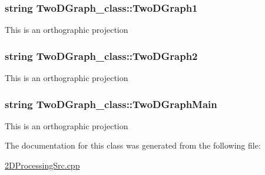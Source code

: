 \subsubsection[{\texorpdfstring{Two\+D\+Graph1}{TwoDGraph1}}]{\setlength{\rightskip}{0pt plus 5cm}string Two\+D\+Graph\+\_\+class\+::\+Two\+D\+Graph1\hspace{0.3cm}{\ttfamily [static]}}\hypertarget{classTwoDGraph__class_a5ca4ece6cefc90e4b73be743f9292d06}{}\label{classTwoDGraph__class_a5ca4ece6cefc90e4b73be743f9292d06}
This is an orthographic projection 
\subsubsection[{\texorpdfstring{Two\+D\+Graph2}{TwoDGraph2}}]{\setlength{\rightskip}{0pt plus 5cm}string Two\+D\+Graph\+\_\+class\+::\+Two\+D\+Graph2\hspace{0.3cm}{\ttfamily [static]}}\hypertarget{classTwoDGraph__class_ade9259accbf5d06b05e65429dfde4ed5}{}\label{classTwoDGraph__class_ade9259accbf5d06b05e65429dfde4ed5}
This is an orthographic projection 
\subsubsection[{\texorpdfstring{Two\+D\+Graph\+Main}{TwoDGraphMain}}]{\setlength{\rightskip}{0pt plus 5cm}string Two\+D\+Graph\+\_\+class\+::\+Two\+D\+Graph\+Main\hspace{0.3cm}{\ttfamily [static]}}\hypertarget{classTwoDGraph__class_aec0627f5c9c38a4b1bfe6aeec7e0237b}{}\label{classTwoDGraph__class_aec0627f5c9c38a4b1bfe6aeec7e0237b}
This is an orthographic projection 

The documentation for this class was generated from the following file\+:\begin{DoxyCompactItemize}
\item 
\hyperlink{2DProcessingSrc_8cpp}{2\+D\+Processing\+Src.\+cpp}\end{DoxyCompactItemize}
